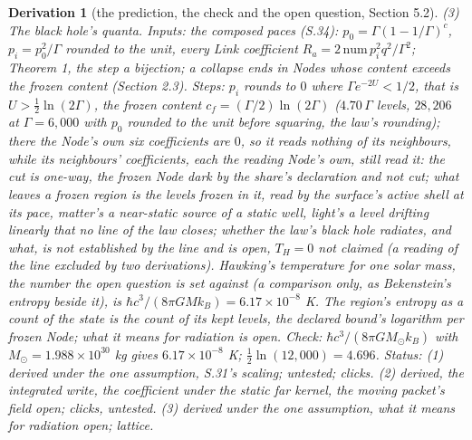 \documentclass[pdflatex,sn-mathphys-num]{sn-jnl}
\newcommand{\num}{\mathrm{num}}
\theoremstyle{thmstyleone}
\newtheorem{derivation}{Derivation}
\begin{document}
\begin{derivation}[the prediction, the check and the open question, Section 5.2]
\emph{(3) The black hole's quanta.} \emph{Inputs:} the composed paces (S.34): $p_0 = \Gamma(1 - 1 / \Gamma)^c$, $p_i = p_0^2 / \Gamma$ rounded to the unit, every Link coefficient $R_a = 2\,\num\,p_i^2 q^2 / \Gamma^2$; Theorem 1, the step a bijection; a collapse ends in Nodes whose content exceeds the frozen content (Section 2.3). \emph{Steps:} $p_i$ rounds to $0$ where $\Gamma e^{-2U} < 1 / 2$, that is $U > \tfrac12\ln(2\Gamma)$, the frozen content $c_f = (\Gamma / 2)\ln(2\Gamma)$ ($4.70\,\Gamma$ levels, $28{,}206$ at $\Gamma = 6{,}000$ with $p_0$ rounded to the unit before squaring, the law's rounding); there the Node's own six coefficients are $0$, so it reads nothing of its neighbours, while its neighbours' coefficients, each the reading Node's own, still read it: the cut is one-way, the frozen Node dark by the share's declaration and not cut; what leaves a frozen region is the levels frozen in it, read by the surface's active shell at its pace, matter's a near-static source of a static well, light's a level drifting linearly that no line of the law closes; whether the law's black hole radiates, and what, is not established by the line and is open, $T_H = 0$ not claimed (a reading of the line excluded by two derivations). Hawking's temperature \cite{hawking1974}\cite{hawking1975} for one solar mass, the number the open question is set against (a comparison only, as Bekenstein's entropy \cite{bekenstein} beside it), is $\hbar c^3 / (8\pi G M k_B) = 6.17 \times 10^{-8}$ K. The region's entropy as a count of the state is the count of its kept levels, the declared bound's logarithm per frozen Node; what it means for radiation is open. \emph{Check:} $\hbar c^3 / (8\pi G M_\odot k_B)$ with $M_\odot = 1.988 \times 10^{30}$ kg gives $6.17 \times 10^{-8}$ K; $\tfrac12\ln(12{,}000) = 4.696$. \emph{Status:} (1) derived under the one assumption, S.31's scaling; untested; clicks. (2) derived, the integrated write, the coefficient under the static far kernel, the moving packet's field open; clicks, untested. (3) derived under the one assumption, what it means for radiation open; lattice.
\end{derivation}
\end{document}
